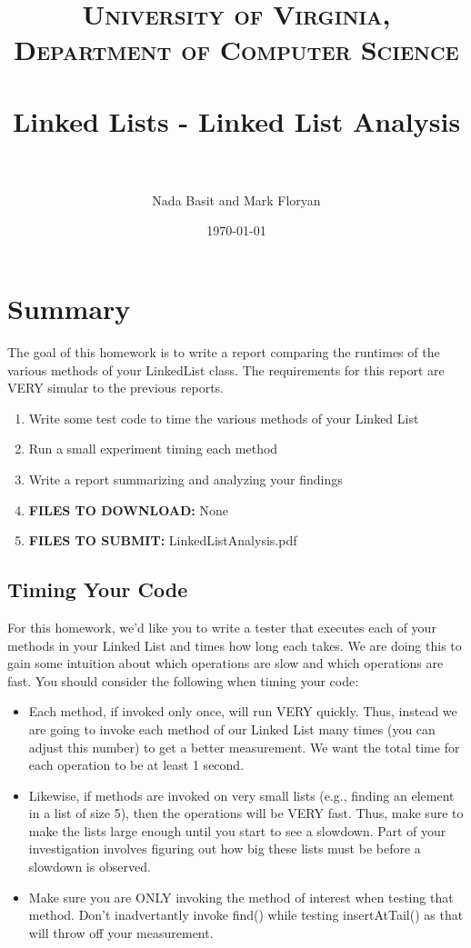\documentclass[paper=a4, fontsize=11pt, parskip=full]{scrartcl} %
\title{
\normalfont \normalsize
\textsc{University of Virginia, Department of Computer Science} \\ [25pt] %
\horrule{0.5pt} \\[0.4cm] %
\huge Linked Lists - Linked List Analysis \\ %
\horrule{2pt} \\[0.5cm] %
}
\author{Nada Basit and Mark Floryan}
\date{\normalsize\today} %
\numberwithin{equation}{section} %
\numberwithin{figure}{section} %
\numberwithin{table}{section} %
\begin{document}
\maketitle %



\section{Summary}

The goal of this homework is to write a report comparing the runtimes of the various methods of your LinkedList class. The requirements for this report are VERY simular to the previous reports.

\begin{enumerate}
	\item Write some test code to time the various methods of your Linked List
	\item Run a small experiment timing each method
	\item Write a report summarizing and analyzing your findings
	\item \textbf{FILES TO DOWNLOAD:} None
	\item \textbf{FILES TO SUBMIT:} LinkedListAnalysis.pdf
\end{enumerate}

\subsection{Timing Your Code}

For this homework, we'd like you to write a tester that executes each of your methods in your Linked List and times how long each takes. We are doing this to gain some intuition about which operations are slow and which operations are fast. You should consider the following when timing your code:

\begin{itemize}
	\item Each method, if invoked only once, will run VERY quickly. Thus, instead we are going to invoke each method of our Linked List many times (you can adjust this number) to get a better measurement. We want the total time for each operation to be at least 1 second.
	\item Likewise, if methods are invoked on very small lists (e.g., finding an element in a list of size 5), then the operations will be VERY fast. Thus, make sure to make the lists large enough until you start to see a slowdown. Part of your investigation involves figuring out how big these lists must be before a slowdown is observed.
	\item Make sure you are ONLY invoking the method of interest when testing that method. Don't inadvertantly invoke find() while testing insertAtTail() as that will throw off your measurement.
\end{itemize}
\end{document}
